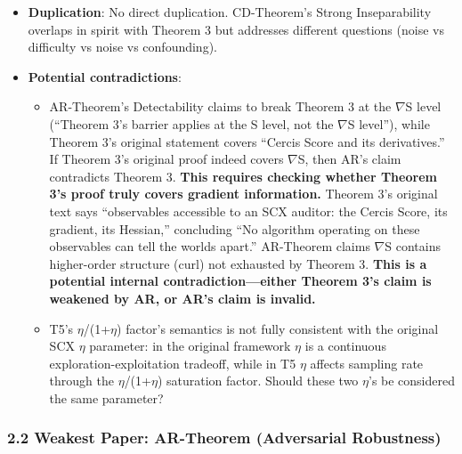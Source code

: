 \documentclass[
  12pt,
]{article}
\providecommand{\tightlist}{%
  \setlength{\itemsep}{0pt}\setlength{\parskip}{0pt}}
\begin{document}
\begin{itemize}
\tightlist
\item
  \textbf{Duplication}: No direct duplication. CD-Theorem's Strong Inseparability overlaps in spirit with Theorem 3 but addresses different questions (noise vs difficulty vs noise vs confounding).
\item
  \textbf{Potential contradictions}:

  \begin{itemize}
  \tightlist
  \item
    AR-Theorem's Detectability claims to break Theorem 3 at the $\nabla$S level (``Theorem 3's barrier applies at the S level, not the $\nabla$S level''), while Theorem 3's original statement covers ``Cercis Score and its derivatives.'' If Theorem 3's original proof indeed covers $\nabla$S, then AR's claim contradicts Theorem 3. \textbf{This requires checking whether Theorem 3's proof truly covers gradient information.} Theorem 3's original text says ``observables accessible to an SCX auditor: the Cercis Score, its gradient, its Hessian,'' concluding ``No algorithm operating on these observables can tell the worlds apart.'' AR-Theorem claims $\nabla$S contains higher-order structure (curl) not exhausted by Theorem 3. \textbf{This is a potential internal contradiction---either Theorem 3's claim is weakened by AR, or AR's claim is invalid.}
  \item
    T5's $\eta$/(1+$\eta$) factor's semantics is not fully consistent with the original SCX $\eta$ parameter: in the original framework $\eta$ is a continuous exploration-exploitation tradeoff, while in T5 $\eta$ affects sampling rate through the $\eta$/(1+$\eta$) saturation factor. Should these two $\eta$'s be considered the same parameter?
  \end{itemize}
\end{itemize}

\subsubsection{2.2 Weakest Paper: \textbf{AR-Theorem (Adversarial Robustness)}}\label{weakest-paper}
\end{document}
